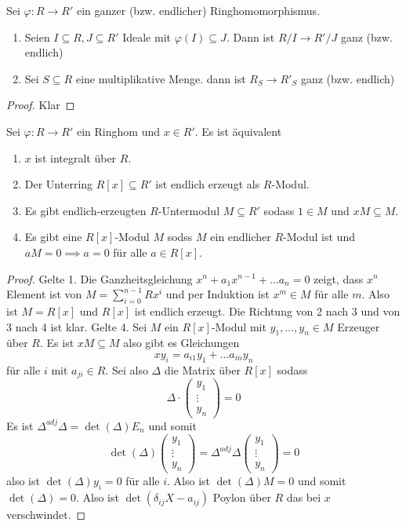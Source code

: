 \begin{Lemma}
    Sei $\varphi\colon R\to R'$ ein ganzer (bzw. endlicher) Ringhomomorphismus.
    \begin{enumerate}
        \item Seien $I\subseteq R,J\subseteq R'$ Ideale mit $\varphi(I)\subseteq J$. Dann ist $R/I\to R'/J$ ganz (bzw. endlich)
        \item Sei $S\subseteq R$ eine multiplikative Menge. dann ist $R_S\to R'_S$ ganz (bzw. endlich)
    \end{enumerate}
\end{Lemma}
\begin{proof}
    Klar
\end{proof}
\begin{Lemma}
    Sei $\varphi\colon R\to R'$ ein Ringhom und $x\in R'$. Es ist äquivalent
    \begin{enumerate}
        \item $x$ ist integralt über $R$.
        \item Der Unterring $R[x]\subseteq R'$ ist endlich erzeugt als $R$-Modul.
        \item Es gibt endlich-erzeugten $R$-Untermodul $M\subseteq R'$ sodass $1\in M$ und $xM\subseteq M$.
        \item Es gibt eine $R[x]$-Modul $M$ sodss $M$ ein endlicher $R$-Modul ist und $aM=0\implies a=0$ für alle $a\in R[x]$.
    \end{enumerate}
\end{Lemma}
\begin{proof}
    Gelte 1. Die Ganzheitsgleichung $x^n+a_1x^{n-1}+\dots a_n=0$ zeigt, dass $x^n$ Element ist von $M=\sum_{i=0}^{n-1}Rx^i$ und per Induktion ist $x^m\in M$ für alle $m$.
    Also ist $M=R[x]$ und $R[x]$ ist endlich erzeugt. Die Richtung von 2 nach 3 und von 3 nach 4 ist klar.
    Gelte 4. Sei $M$ ein $R[x]$-Modul mit $y_1,\dots,y_n\in M$ Erzeuger über $R$.
    Es ist $xM\subseteq M$ also gibt es Gleichungen 
    $$xy_i=a_{i1}y_1+\dots a_{in}y_n$$ für alle $i$ mit $a_{ji}\in R$.
    Sei also $\Delta$ die Matrix über $R[x]$ sodass 
    $$\Delta\cdot\begin{pmatrix}
        y_1\\ \vdots \\ y_n
    \end{pmatrix}=0$$
    Es ist $\Delta^{adj}\Delta=\det(\Delta)E_n$ und somit 
    $$\det(\Delta)\begin{pmatrix}
        y_1\\ \vdots \\y_n
    \end{pmatrix}=\Delta^{adj}\Delta\begin{pmatrix}
        y_1\\ \vdots \\y_n
    \end{pmatrix}=0$$ also ist $\det(\Delta)y_i=0$ für alle $i$.
    Also ist $\det(\Delta)M=0$ und somit $\det(\Delta)=0$.
    Also ist $\det(\delta_{ij}X-a_{ij})$ Poylon über $R$ das bei $x$ verschwindet.
    
\end{proof}
